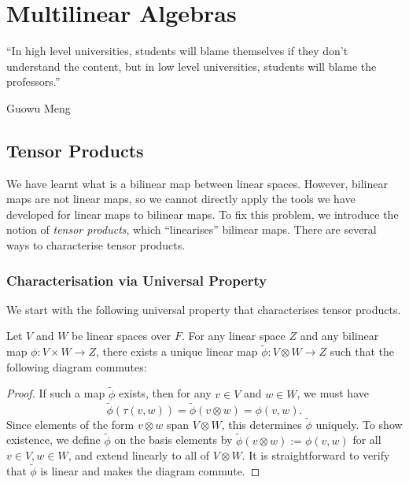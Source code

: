 \chapter{Multilinear Algebras}

\epigraph{``In high level universities, students will blame themselves if they don't understand the content, but in low level universities, students will blame the professors.''}{Guowu Meng}

\section{Tensor Products}

We have learnt what is a bilinear map between linear spaces. However, bilinear maps are not linear maps, so we cannot directly apply the tools we have developed for linear maps to bilinear maps. To fix this problem, we introduce the notion of \emph{tensor products}, which ``linearises'' bilinear maps. There are several ways to characterise tensor products.

\subsection{Characterisation via Universal Property}
We start with the following universal property that characterises tensor products.
\begin{proposition}\label{prop:universal_property_tensor_product}
	Let $V$ and $W$ be linear spaces over $F$. For any linear space $Z$ and any bilinear map $\phi \colon V \times W \to Z$, there exists a unique linear map $\widetilde{\phi} \colon V \otimes W \to Z$ such that the following diagram commutes:
	\begin{center}
	\end{center}
\end{proposition}
\begin{proof}
	If such a map $\widetilde{\phi}$ exists, then for any $v \in V$ and $w \in W$, we must have
	\[
		\widetilde{\phi}(\tau(v, w)) = \widetilde{\phi}(v \otimes w) = \phi(v, w).
	\]
	Since elements of the form $v \otimes w$ span $V \otimes W$, this determines $\widetilde{\phi}$ uniquely. To show existence, we define $\widetilde{\phi}$ on the basis elements by $\widetilde{\phi}(v \otimes w) := \phi(v, w)$ for all $v \in V, w \in W$, and extend linearly to all of $V \otimes W$. It is straightforward to verify that $\widetilde{\phi}$ is linear and makes the diagram commute.
\end{proof}

